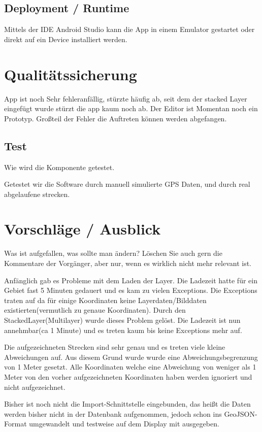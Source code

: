 \subsection{Deployment / Runtime}
Mittels der IDE Android Studio kann die App in einem Emulator gestartet oder direkt auf ein Device installiert werden.

\section{Qualitätssicherung}

App ist noch Sehr fehleranfällig, stürzte häufig ab, seit dem der stacked Layer eingefügt wurde stürzt die app kaum noch ab. Der Editor ist Momentan noch ein Prototyp.
Großteil der Fehler die Auftreten können werden abgefangen.

\subsection{Test}
Wie wird die Komponente getestet.

Getestet wir die Software durch manuell simulierte GPS Daten, und durch real abgelaufene strecken.

\section{Vorschläge / Ausblick}
Was ist aufgefallen, was sollte man ändern? Löschen Sie auch gern die Kommentare
der Vorgänger, aber nur, wenn es wirklich nicht mehr relevant ist.

Anfänglich gab es Probleme mit dem Laden der Layer. Die Ladezeit hatte für ein Gebiet fast 5 Minuten gedauert und es kam zu vielen Exceptions. Die Exceptions traten auf da für einige Koordinaten keine Layerdaten/Bilddaten existierten(vermutlich zu genaue Koordinaten). Durch den StackedLayer(Multilayer) wurde dieses Problem gelöst. Die Ladezeit ist nun annehmbar(ca 1 Minute) und es treten kaum bis keine Exceptions mehr auf.

Die aufgezeichneten Strecken sind sehr genau und es treten viele kleine Abweichungen auf. Aus diesem Grund wurde wurde eine Abweichungsbegrenzung von 1 Meter gesetzt. Alle Koordinaten welche eine Abweichung von weniger als 1 Meter von den vorher aufgezeichneten Koordinaten haben werden ignoriert und nicht aufgezeichnet.

Bisher ist noch nicht die Import-Schnittstelle eingebunden, das heißt die Daten werden bisher nicht in der Datenbank aufgenommen, jedoch schon ins GeoJSON-Format umgewandelt und testweise auf dem Display mit ausgegeben.

